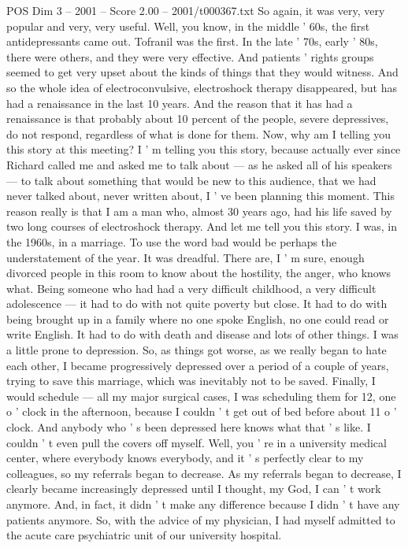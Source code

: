 \begin{textsample}{POS Dim 3 – 2001 – Score 2.00 – 2001/t000367.txt}
So again, it was very, very popular and very, very useful.
Well, you know, in the middle ' 60s, the first antidepressants came out.
Tofranil was the first.
In the late ' 70s, early ' 80s, there were others, and they were very effective.
And patients ' rights groups seemed to get very upset about the kinds of things that they would witness.
And so the whole idea of electroconvulsive, electroshock therapy disappeared, but has had a renaissance in the last 10 years.
And the reason that it has had a renaissance is that probably about 10 percent of the people, severe depressives, do not respond, regardless of what is done for them.
Now, why am I telling you this story at this meeting?
I ' m telling you this story, because actually ever since Richard called me and asked me to talk about — as he asked all of his speakers — to talk about something that would be new to this audience, that we had never talked about, never written about, I ' ve been planning this moment.
This reason really is that I am a man who, almost 30 years ago, had his life saved by two long courses of electroshock therapy.
And let me tell you this story.
I was, in the 1960s, in a marriage.
To use the word bad would be perhaps the understatement of the year.
It was dreadful.
There are, I ' m sure, enough divorced people in this room to know about the hostility, the anger, who knows what.
Being someone who had had a very difficult childhood, a very difficult adolescence — it had to do with not quite poverty but close.
It had to do with being brought up in a family where no one spoke English, no one could read or write English.
It had to do with death and disease and lots of other things.
I was a little prone to depression.
So, as things got worse, as we really began to hate each other, I became progressively depressed over a period of a couple of years, trying to save this marriage, which was inevitably not to be saved.
Finally, I would schedule — all my major surgical cases, I was scheduling them for 12, one o ' clock in the afternoon, because I couldn ' t get out of bed before about 11 o ' clock.
And anybody who ' s been depressed here knows what that ' s like.
I couldn ' t even pull the covers off myself.
Well, you ' re in a university medical center, where everybody knows everybody, and it ' s perfectly clear to my colleagues, so my referrals began to decrease.
As my referrals began to decrease, I clearly became increasingly depressed until I thought, my God, I can ' t work anymore.
And, in fact, it didn ' t make any difference because I didn ' t have any patients anymore.
So, with the advice of my physician, I had myself admitted to the acute care psychiatric unit of our university hospital.

\end{textsample}
